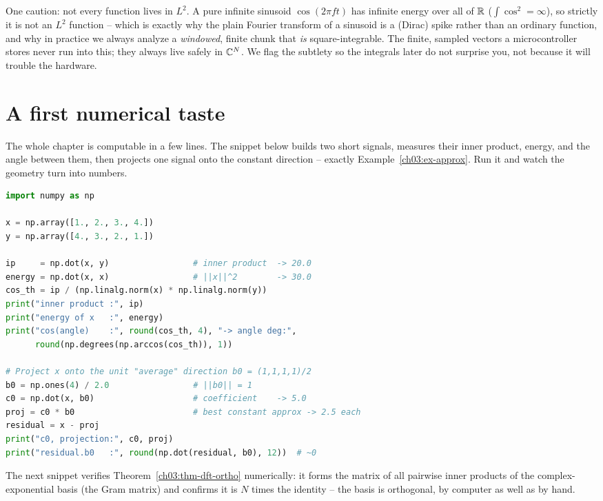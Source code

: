 \begin{formalbox}
One caution: not every function lives in $L^2$. A pure infinite sinusoid $\cos(2\pi f t)$
has infinite energy over all of $\mathbb{R}$ ($\int \cos^2 = \infty$), so strictly it is not an $L^2$
function -- which is exactly why the plain Fourier transform of a sinusoid is a (Dirac) spike rather
than an ordinary function, and why in practice we always analyze a \emph{windowed}, finite chunk that
\emph{is} square-integrable. The finite, sampled vectors a microcontroller stores never run
into this; they always live safely in $\mathbb{C}^N$. We flag the subtlety so the integrals later do not
surprise you, not because it will trouble the hardware.
\end{formalbox}

\section{A first numerical taste}
\label{ch03:numerics}

The whole chapter is computable in a few lines. The snippet below builds two short signals, measures
their inner product, energy, and the angle between them, then projects one signal onto the
constant direction -- exactly Example~\ref{ch03:ex-approx}. Run it and watch the geometry turn into
numbers.

\begin{lstlisting}[language=Python,caption={Signals as vectors: inner product, energy, angle, projection.},label={ch03:code-inner}]
import numpy as np

x = np.array([1., 2., 3., 4.])
y = np.array([4., 3., 2., 1.])

ip     = np.dot(x, y)                 # inner product  -> 20.0
energy = np.dot(x, x)                 # ||x||^2        -> 30.0
cos_th = ip / (np.linalg.norm(x) * np.linalg.norm(y))
print("inner product :", ip)
print("energy of x   :", energy)
print("cos(angle)    :", round(cos_th, 4), "-> angle deg:",
      round(np.degrees(np.arccos(cos_th)), 1))

# Project x onto the unit "average" direction b0 = (1,1,1,1)/2
b0 = np.ones(4) / 2.0                 # ||b0|| = 1
c0 = np.dot(x, b0)                    # coefficient    -> 5.0
proj = c0 * b0                        # best constant approx -> 2.5 each
residual = x - proj
print("c0, projection:", c0, proj)
print("residual.b0   :", round(np.dot(residual, b0), 12))  # ~0
\end{lstlisting}

The next snippet verifies Theorem~\ref{ch03:thm-dft-ortho} numerically: it forms the matrix of all
pairwise inner products of the complex-exponential basis (the Gram matrix) and confirms it is $N$ times the identity --
the basis is orthogonal, by computer as well as by hand.


